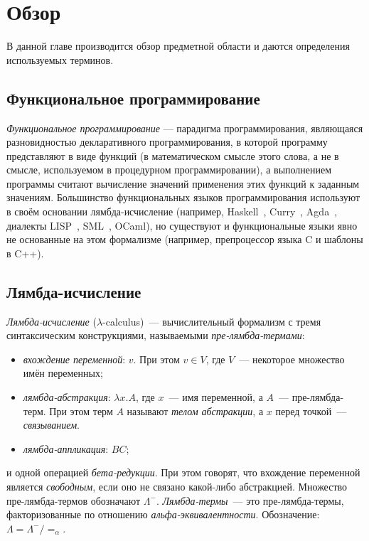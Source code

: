 \chapter{Обзор
}
\label{chapter1}

В данной главе производится обзор предметной области и даются определения используемых терминов.

\section{Функциональное программирование}

\emph{Функциональное программирование} — парадигма программирования,
являющаяся разновидностью декларативного программирования,
в которой программу представляют в виде функций
(в математическом смысле этого слова, а не в смысле, используемом в процедурном программировании),
а выполнением программы считают вычисление значений применения этих функций к заданным значениям.
Большинство функциональных языков программирования используют в своём основании лямбда-исчисление
(например, Haskell~\cite{HaskellLang}, Curry~\cite{CurryLang}, Agda~\cite{AgdaLang},
диалекты LISP~\cite{SchemeLang,ClojureLang,SICP}, SML~\cite{SMLLang}, OCaml\cite{OCamlLang}),
но существуют и функциональные языки явно не основанные на этом формализме
(например, препроцессор языка C и шаблоны в C++).

\section{Лямбда-исчисление}

\emph{Лямбда-исчисление} ($\lambda$-calculus)~--- вычислительный формализм
с тремя синтаксическим конструкциями, называемыми \emph{пре-лямбда-термами}:
\begin{itemize}
\item \emph{вхождение переменной}: $v$. При этом $v \in V$, где $V$~--- некоторое множество имён переменных;
\item \emph{лямбда-абстракция}: $\lambda x.A$, где $x$~--- имя переменной, а $A$~--- пре-лямбда-терм. При этом терм $A$ называют \emph{телом абстракции}, а $x$ перед точкой~--- \emph{связыванием}.
\item \emph{лямбда-аппликация}: $B C$;
\end{itemize}
и одной операцией \emph{бета-редукции}.
При этом говорят, что вхождение переменной является \emph{свободным},
если оно не связано какой-либо абстракцией.
Множество пре-лямбда-термов обозначают $\Lambda^{-}$.
\emph{Лямбда-термы}~--- это пре-лямбда-термы, факторизованные по отношению \emph{альфа-эквивалентности}.
Обозначение: $\Lambda = \Lambda^{-} / =_{\alpha} $.

